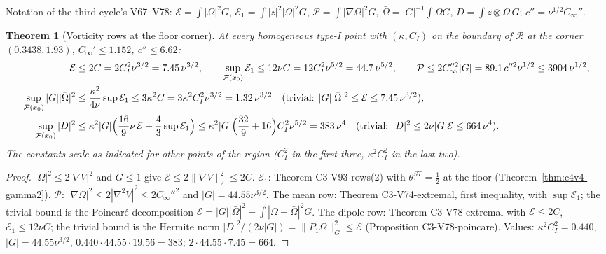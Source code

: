 \documentclass[11pt]{article}
\theoremstyle{plain}
\newtheorem{theorem}{Theorem}[section]
\theoremstyle{definition}
\theoremstyle{remark}
\begin{document}
Notation of the third cycle's V67--V78: \(\mathcal E=\int|\Omega|^2G\), \(\mathcal E_1=\int|z|^2|\Omega|^2G\),
\(\mathcal P=\int|\nabla\Omega|^2G\), \(\bar\Omega=|G|^{-1}\int\Omega G\), \(D=\int z\otimes\Omega\,G\); \(c''=\nu^{1/2}C_\infty''\).

\begin{theorem}[Vorticity rows at the floor corner]
\label{thm:c4v13-rows}
At every homogeneous type-I point with \((\kappa,C_I)\) on the boundary of
\(\mathcal R\) at the corner \((0.3438,1.93)\), \(C_\infty'\le1.152\), \(c''\le6.62\):
\begin{align}
 \mathcal E&\le2C=2C_I^2\nu^{3/2}=7.45\,\nu^{3/2},\qquad
 \sup_{\mathcal F(x_0)}\mathcal E_1\le12\nu C=12C_I^2\nu^{5/2}=44.7\,\nu^{5/2},\qquad
 \mathcal P\le2C_\infty''^2|G|=89.1\,c''^2\nu^{1/2}\le3904\,\nu^{1/2},
 \label{eq:c4v13-EP}\\
 \sup_{\mathcal F(x_0)}|G||\bar\Omega|^2&\le\frac{\kappa^2}{4\nu}\sup\mathcal E_1\le3\kappa^2C=3\kappa^2C_I^2\nu^{3/2}=1.32\,\nu^{3/2}
 \quad(\text{trivial: }|G||\bar\Omega|^2\le\mathcal E\le7.45\,\nu^{3/2}),
 \label{eq:c4v13-mean}\\
 \sup_{\mathcal F(x_0)}|D|^2&\le\kappa^2|G|\Bigl(\frac{16}9\nu\,\mathcal E+\frac43\sup\mathcal E_1\Bigr)\le\kappa^2|G|\Bigl(\frac{32}9+16\Bigr)C_I^2\nu^{5/2}=383\,\nu^4
 \quad(\text{trivial: }|D|^2\le2\nu|G|\mathcal E\le664\,\nu^4).
 \label{eq:c4v13-dipole}
\end{align}
The constants scale as indicated for other points of the region
(\(C_I^2\) in the first three, \(\kappa^2C_I^2\) in the last two).
\end{theorem}

\begin{proof}
\(|\Omega|^2\le2|\nabla V|^2\) and \(G\le1\) give \(\mathcal E\le2\|\nabla V\|_2^2\le2C\).  \(\mathcal E_1\): Theorem
C3-V93-rows(2) with \(\theta_1^{ST}=\frac12\) at the floor (Theorem~\ref{thm:c4v4-gamma2}).
\(\mathcal P\): \(|\nabla\Omega|^2\le2|\nabla^2V|^2\le2C_\infty''^2\) and \(|G|=44.55\nu^{3/2}\).  The mean row:
Theorem C3-V74-extremal, first inequality, with \(\sup\mathcal E_1\); the trivial
bound is the Poincar\'e decomposition \(\mathcal E=|G||\bar\Omega|^2+\int|\Omega-\bar\Omega|^2G\).  The
dipole row: Theorem C3-V78-extremal with \(\mathcal E\le2C\), \(\mathcal E_1\le12\nu C\); the trivial
bound is the Hermite norm \(|D|^2/(2\nu|G|)=\|P_1\Omega\|_G^2\le\mathcal E\) (Proposition
C3-V78-poincare).  Values: \(\kappa^2C_I^2=0.440\), \(|G|=44.55\nu^{3/2}\),
\(0.440\cdot44.55\cdot19.56=383\); \(2\cdot44.55\cdot7.45=664\).
\end{proof}
\end{document}

